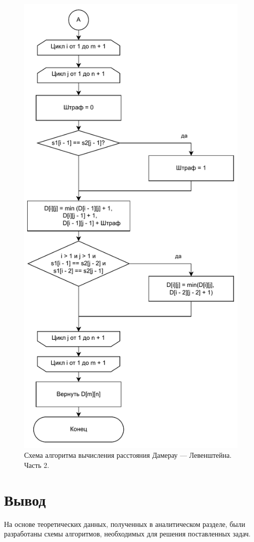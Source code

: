 \begin{figure}[H]
    \centering
    \includegraphics[width=120mm]{images/dl_part2}
    \caption{Схема алгоритма вычисления расстояния Дамерау — Левенштейна. Часть 2.}
    \label{images:dl_part2}
\end{figure}

\vspace{0.5cm}
\section*{Вывод}

На основе теоретических данных, полученных в аналитическом разделе, были разработаны схемы алгоритмов, необходимых для решения поставленных задач.